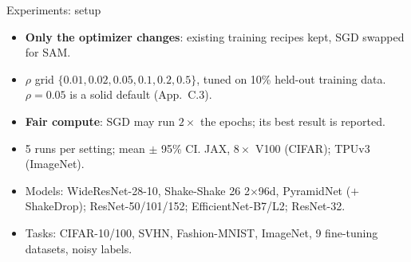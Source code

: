 \documentclass[aspectratio=169,10pt]{beamer}
\begin{document}
\begin{frame}{Experiments: setup}
\begin{itemize}\setlength{\itemsep}{0.55em}
  \item \textbf{Only the optimizer changes}: existing training recipes kept, SGD swapped for SAM.
  \item $\rho$ grid $\{0.01, 0.02, 0.05, 0.1, 0.2, 0.5\}$, tuned on 10\% held-out training data. \;$\rho=0.05$ is a solid default (App.\ C.3).
  \item \textbf{Fair compute}: SGD may run $2\times$ the epochs; its best result is reported.
  \item 5 runs per setting; mean $\pm$ 95\% CI. \;JAX, $8\times$ V100 (CIFAR); TPUv3 (ImageNet).
  \item Models: WideResNet-28-10, Shake-Shake 26 2$\times$96d, PyramidNet ($+$ShakeDrop); ResNet-50/101/152; EfficientNet-B7/L2; ResNet-32.
  \item Tasks: CIFAR-10/100, SVHN, Fashion-MNIST, ImageNet, 9 fine-tuning datasets, noisy labels.
\end{itemize}
\end{frame}
\end{document}
